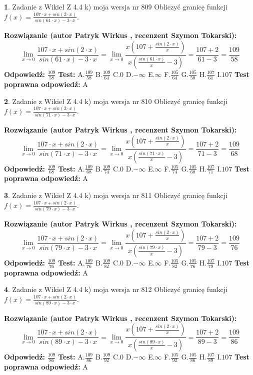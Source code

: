 \documentclass[12pt, a4paper]{article}
\theoremstyle{definition} %
\newtheorem{zad}{}
\newcommand{\zadStart}[1]{\begin{zad}#1\newline}
\newcommand{\zadStop}{\end{zad}}
\newcommand{\rozwStart}[2]{\noindent \textbf{Rozwiązanie (autor #1 , recenzent #2): }\newline}
\newcommand{\rozwStop}{\newline}
\newcommand{\odpStart}{\noindent \textbf{Odpowiedź:}\newline}
\newcommand{\odpStop}{\newline}
\newcommand{\testStart}{\noindent \textbf{Test:}\newline}
\newcommand{\testStop}{\newline}
\newcommand{\kluczStart}{\noindent \textbf{Test poprawna odpowiedź:}\newline}
\newcommand{\kluczStop}{\newline}
\begin{document}
\zadStart{Zadanie z Wikieł Z 4.4 k) moja wersja nr 809}
Obliczyć granicę funkcji $f(x)=\frac{107\cdot x +sin(2\cdot x)}{sin(61\cdot x) -3\cdot x}$.
\zadStop
\rozwStart{Patryk Wirkus}{Szymon Tokarski}
$$\lim\limits_{x\to 0}\frac{107\cdot x +sin(2\cdot x)}{sin(61\cdot x) -3\cdot x}
=\lim\limits_{x\to 0}\frac{x(107+\frac{sin(2\cdot x)}{x})}{x(\frac{sin(61\cdot x)}{x}-3)}
=\frac{107+2}{61-3} = \frac{109}{58}$$
\rozwStop
\odpStart
$\frac{109}{58}$
\odpStop
\testStart
A.$\frac{109}{58}$
B.$\frac{109}{64}$
C.$0$
D.$-\infty$
E.$\infty$
F.$\frac{105}{64}$
G.$\frac{105}{58}$
H.$\frac{107}{61}$
I.$107$
\testStop
\kluczStart
A
\kluczStop



\zadStart{Zadanie z Wikieł Z 4.4 k) moja wersja nr 810}
Obliczyć granicę funkcji $f(x)=\frac{107\cdot x +sin(2\cdot x)}{sin(71\cdot x) -3\cdot x}$.
\zadStop
\rozwStart{Patryk Wirkus}{Szymon Tokarski}
$$\lim\limits_{x\to 0}\frac{107\cdot x +sin(2\cdot x)}{sin(71\cdot x) -3\cdot x}
=\lim\limits_{x\to 0}\frac{x(107+\frac{sin(2\cdot x)}{x})}{x(\frac{sin(71\cdot x)}{x}-3)}
=\frac{107+2}{71-3} = \frac{109}{68}$$
\rozwStop
\odpStart
$\frac{109}{68}$
\odpStop
\testStart
A.$\frac{109}{68}$
B.$\frac{109}{74}$
C.$0$
D.$-\infty$
E.$\infty$
F.$\frac{105}{74}$
G.$\frac{105}{68}$
H.$\frac{107}{71}$
I.$107$
\testStop
\kluczStart
A
\kluczStop



\zadStart{Zadanie z Wikieł Z 4.4 k) moja wersja nr 811}
Obliczyć granicę funkcji $f(x)=\frac{107\cdot x +sin(2\cdot x)}{sin(79\cdot x) -3\cdot x}$.
\zadStop
\rozwStart{Patryk Wirkus}{Szymon Tokarski}
$$\lim\limits_{x\to 0}\frac{107\cdot x +sin(2\cdot x)}{sin(79\cdot x) -3\cdot x}
=\lim\limits_{x\to 0}\frac{x(107+\frac{sin(2\cdot x)}{x})}{x(\frac{sin(79\cdot x)}{x}-3)}
=\frac{107+2}{79-3} = \frac{109}{76}$$
\rozwStop
\odpStart
$\frac{109}{76}$
\odpStop
\testStart
A.$\frac{109}{76}$
B.$\frac{109}{82}$
C.$0$
D.$-\infty$
E.$\infty$
F.$\frac{105}{82}$
G.$\frac{105}{76}$
H.$\frac{107}{79}$
I.$107$
\testStop
\kluczStart
A
\kluczStop



\zadStart{Zadanie z Wikieł Z 4.4 k) moja wersja nr 812}
Obliczyć granicę funkcji $f(x)=\frac{107\cdot x +sin(2\cdot x)}{sin(89\cdot x) -3\cdot x}$.
\zadStop
\rozwStart{Patryk Wirkus}{Szymon Tokarski}
$$\lim\limits_{x\to 0}\frac{107\cdot x +sin(2\cdot x)}{sin(89\cdot x) -3\cdot x}
=\lim\limits_{x\to 0}\frac{x(107+\frac{sin(2\cdot x)}{x})}{x(\frac{sin(89\cdot x)}{x}-3)}
=\frac{107+2}{89-3} = \frac{109}{86}$$
\rozwStop
\odpStart
$\frac{109}{86}$
\odpStop
\testStart
A.$\frac{109}{86}$
B.$\frac{109}{92}$
C.$0$
D.$-\infty$
E.$\infty$
F.$\frac{105}{92}$
G.$\frac{105}{86}$
H.$\frac{107}{89}$
I.$107$
\testStop
\kluczStart
A
\kluczStop
\end{document}
